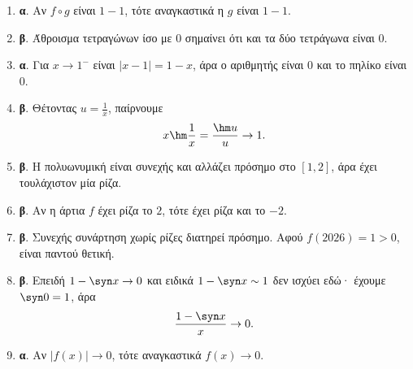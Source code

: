 \begin{enumerate}[label=\textbf{1.\arabic*.}]
\item \textbf{α}. Αν $f\circ g$ είναι $1-1$, τότε αναγκαστικά η $g$ είναι $1-1$.
\item \textbf{β}. Άθροισμα τετραγώνων ίσο με $0$ σημαίνει ότι και τα δύο τετράγωνα είναι $0$.
\item \textbf{α}. Για $x\to1^-$ είναι $|x-1|=1-x$, άρα ο αριθμητής είναι $0$ και το πηλίκο είναι $0$.
\item \textbf{β}. Θέτοντας $u=\frac1x$, παίρνουμε
\[
x\hm\frac1x=\frac{\hm u}{u}\to1.
\]
\item \textbf{β}. Η πολυωνυμική είναι συνεχής και αλλάζει πρόσημο στο $[1,2]$, άρα έχει τουλάχιστον μία ρίζα.
\item \textbf{β}. Αν η άρτια $f$ έχει ρίζα το $2$, τότε έχει ρίζα και το $-2$.
\item \textbf{β}. Συνεχής συνάρτηση χωρίς ρίζες διατηρεί πρόσημο. Αφού $f(2026)=1>0$, είναι παντού θετική.
\item \textbf{β}. Επειδή $1-\syn x\to0$ και ειδικά $1-\syn x\sim1$ δεν ισχύει εδώ· έχουμε $\syn0=1$, άρα
\[
\frac{1-\syn x}{x}\to0.
\]
\item \textbf{α}. Αν $|f(x)|\to0$, τότε αναγκαστικά $f(x)\to0$.
\end{enumerate}

